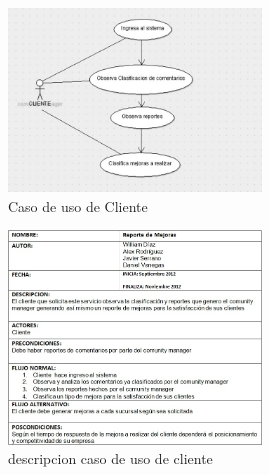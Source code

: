 \begin{figure}[htbp]
	\centering
		\includegraphics[width=0.60\textwidth]{images/casoproducciongrafico.jpg}
	\caption{Caso de uso de Cliente}
	\label{fig:Caso de uso de Cliente}
\end{figure}%
\begin{figure}[htbp]
	\centering
		\includegraphics[width=0.60\textwidth]{images/casoproducciontabla.jpg}
	\caption{descripcion caso de uso de cliente}
	\label{fig:descripcion caso de uso de cliente}
\end{figure}%
